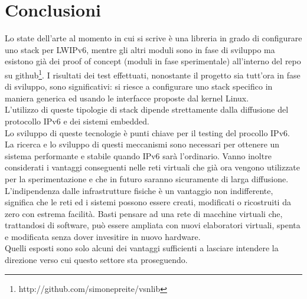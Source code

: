 
\chapter*{Conclusioni}
Lo state dell'arte al momento in cui si scrive \`e una libreria in grado di configurare uno stack per LWIPv6, mentre gli altri moduli sono in fase di sviluppo ma esistono gi\`a dei proof of concept (moduli in fase sperimentale) all'interno del repo su github\footnote{http://github.com/simonepreite/vsnlib}.
I risultati dei test effettuati, nonostante il progetto sia tutt'ora in fase di sviluppo, sono significativi: si riesce a configurare uno stack specifico in maniera generica ed usando le interfacce proposte dal kernel Linux.\\
L'utilizzo di queste tipologie di stack dipende strettamente dalla diffusione del protocollo IPv6 e dei sistemi embedded.\\
Lo sviluppo di queste tecnologie \`e punti chiave per il testing del procollo IPv6.\\
La ricerca e lo sviluppo di questi meccanismi sono necessari per ottenere un sistema performante e stabile quando IPv6 sar\`a l'ordinario. Vanno inoltre considerati i vantaggi conseguenti nelle reti virtuali che gi\`a ora vengono utilizzate per la sperimentazione e che in futuro saranno sicuramente di larga diffusione.\\
L'indipendenza dalle infrastrutture fisiche \`e un vantaggio non indifferente, significa che le reti ed i sistemi possono essere creati, modificati o ricostruiti da zero con estrema facilit\`a. Basti pensare ad una rete di macchine virtuali che, trattandosi di software, pu\`o essere ampliata con nuovi elaboratori virtuali, spenta e modificata senza dover invesitire in nuovo hardware.\\
Quelli esposti sono solo alcuni dei vantaggi sufficienti a lasciare intendere la direzione verso cui questo settore sta proseguendo.
